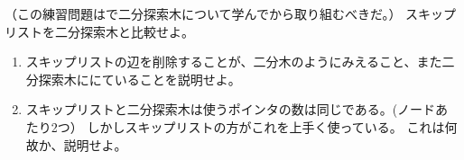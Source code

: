 \begin{exc}
  （この練習問題はで二分探索木について学んでから取り組むべきだ。）
  スキップリストを二分探索木と比較せよ。
  \begin{enumerate}
     \item スキップリストの辺を削除することが、二分木のようにみえること、また二分探索木ににていることを説明せよ。
     \item スキップリストと二分探索木は使うポインタの数は同じである。(ノードあたり2つ）
	 しかしスキップリストの方がこれを上手く使っている。
	 これは何故か、説明せよ。
  \end{enumerate}
\end{exc}

